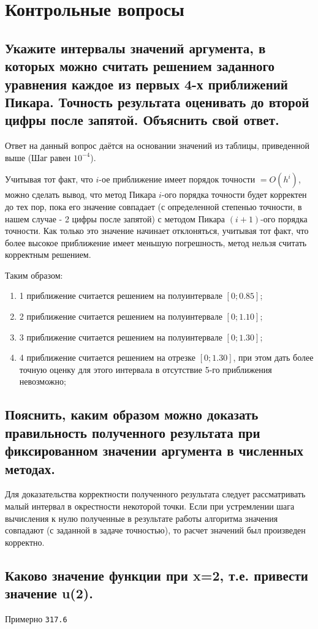 \chapter{Контрольные вопросы}

\section{Укажите интервалы значений аргумента, в которых можно считать решением заданного уравнения каждое из первых 4-х приближений Пикара. Точность результата оценивать до второй цифры после запятой. Объяснить свой ответ.}

Ответ на данный вопрос даётся на основании значений из таблицы, приведенной выше (Шаг равен $10^{-4}$). 

Учитывая тот факт, что $i$-ое приближение имеет порядок точности $= O(h^{i})$, можно сделать вывод, что метод Пикара $i$-ого порядка точности будет корректен до тех пор, пока его значение совпадает (с определенной степенью точности, в нашем случае - 2 цифры после запятой) с методом Пикара $(i+1)$-ого порядка точности. Как только это значение начинает отклоняться, учитывая тот факт, что более высокое приближение имеет меньшую погрешность, метод нельзя считать корректным решением.

Таким образом:
\begin{enumerate}
    \item 1 приближение считается решением на полуинтервале $[0; 0.85]$;
    \item 2 приближение считается решением на полуинтервале $[0; 1.10]$;
    \item 3 приближение считается решением на полуинтервале $[0; 1.30]$;
    \item 4 приближение считается решением на отрезке $[0; 1.30]$, при этом дать более точную оценку для этого интервала в отсутствие 5-го приближения невозможно;
\end{enumerate}

\section{Пояснить, каким образом можно доказать правильность полученного результата при фиксированном значении аргумента в численных методах.}

Для доказательства корректности полученного результата следует рассматривать малый интервал в окрестности некоторой точки. Если при устремлении шага вычисления к нулю полученные в результате работы алгоритма значения совпадают (с заданной в задаче точностью), то расчет значений был произведен корректно.

\section{Каково значение функции при x=2, т.е. привести значение u(2).}

Примерно \texttt{317.6}